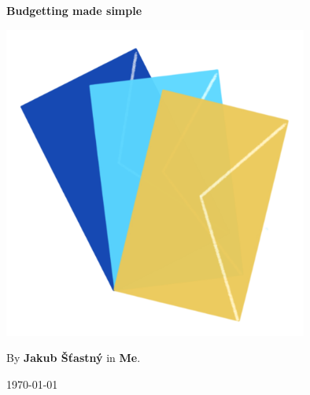 \pagecolor{CoverPageBackground}

\begin{titlepage}
  \begin{center}

    \textbf{\huge \color{DarkRed} Budgetting made simple}
    \vspace{1.7cm}

    \includegraphics[width=0.75\textwidth]{"assets/envelopes"}
    \vfill

    {\large \color{Indigo} By \textbf{Jakub Šťastný} in \textbf{{\color{DarkRed} Me}}.}

    \vspace{0.8cm}
    \large\today
  \end{center}
\end{titlepage}

\pagecolor{PageBackground}
